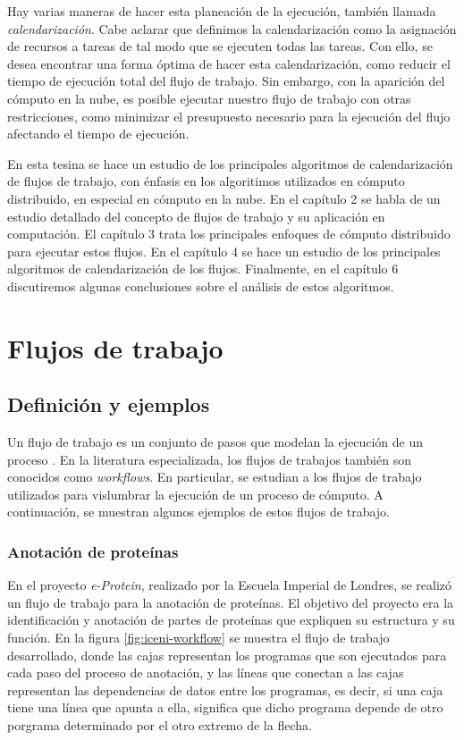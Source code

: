 \documentclass[letterpaper, 12pt]{report}
\begin{document}
Hay varias maneras de hacer esta planeación de la ejecución, también llamada \emph{calendarización}. Cabe aclarar que definimos la calendarización como la asignación de recursos a tareas de tal modo que se ejecuten todas las tareas. Con ello, se desea encontrar una forma óptima de hacer esta calendarización, como reducir el tiempo de ejecución total del flujo de trabajo. Sin embargo, con la aparición del cómputo en la nube, es posible ejecutar nuestro flujo de trabajo con otras restricciones, como minimizar el presupuesto necesario para la ejecución del flujo afectando el tiempo de ejecución.



En esta tesina se hace un estudio de los principales algoritmos de calendarización de flujos de trabajo, con énfasis en los algoritimos utilizados en cómputo distribuido, en especial en cómputo en la nube. En el capítulo 2 se habla de un estudio detallado del concepto de flujos de trabajo y su aplicación en computación. El capítulo 3 trata los principales enfoques de cómputo distribuido para ejecutar estos flujos. En el capítulo 4 se hace un estudio de los principales algoritmos de calendarización de los flujos. Finalmente, en el capítulo 6 discutiremos algunas conclusiones sobre el análisis de estos algoritmos.


\chapter{Flujos de trabajo}

\section{Definición y ejemplos}
Un flujo de trabajo es un conjunto de pasos que modelan la ejecución de un proceso \cite{gutierrez2012agent}. En la literatura especializada, los flujos de trabajos también son conocidos como \emph{workflows}. En particular, se estudian a los flujos de trabajo utilizados para vislumbrar la ejecución de un proceso de cómputo. A continuación, se muestran algunos ejemplos de estos flujos de trabajo.

\subsection{Anotación de proteínas}
En el proyecto \emph{e-Protein}, realizado por la Escuela Imperial de Londres, se realizó un flujo de trabajo para la anotación de proteínas. El objetivo del proyecto \cite{o2004mapping} era la identificación y anotación de partes de proteínas que expliquen su estructura y su función. En la figura \ref{fig:iceni-workflow} se muestra el flujo de trabajo desarrollado, donde las cajas representan los programas que son ejecutados para cada paso del proceso de anotación, y las líneas que conectan a las cajas representan las dependencias de datos entre los programas, es decir, si una caja tiene una línea que apunta a ella, significa que dicho programa depende de otro porgrama determinado por el otro extremo de la flecha.
\end{document}
